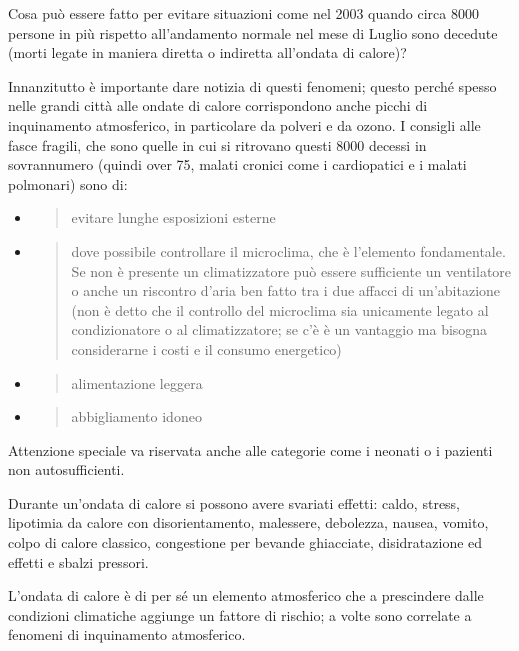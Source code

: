 \documentclass[]{article}
\begin{document}
Cosa può essere fatto per evitare situazioni come nel 2003 quando circa
8000 persone in più rispetto all'andamento normale nel mese di Luglio
sono decedute (morti legate in maniera diretta o indiretta all'ondata di
calore)?

Innanzitutto è importante dare notizia di questi fenomeni; questo perché
spesso nelle grandi città alle ondate di calore corrispondono anche
picchi di inquinamento atmosferico, in particolare da polveri e da
ozono. I consigli alle fasce fragili, che sono quelle in cui si
ritrovano questi 8000 decessi in sovrannumero (quindi over 75, malati
cronici come i cardiopatici e i malati polmonari) sono di:

\begin{itemize}
\item
  \begin{quote}
  evitare lunghe esposizioni esterne
  \end{quote}
\item
  \begin{quote}
  dove possibile controllare il microclima, che è l'elemento
  fondamentale. Se non è presente un climatizzatore può essere
  sufficiente un ventilatore o anche un riscontro d'aria ben fatto tra i
  due affacci di un'abitazione (non è detto che il controllo del
  microclima sia unicamente legato al condizionatore o al
  climatizzatore; se c'è è un vantaggio ma bisogna considerarne i costi
  e il consumo energetico)
  \end{quote}
\item
  \begin{quote}
  alimentazione leggera
  \end{quote}
\item
  \begin{quote}
  abbigliamento idoneo
  \end{quote}
\end{itemize}

Attenzione speciale va riservata anche alle categorie come i neonati o i
pazienti non autosufficienti.

Durante un'ondata di calore si possono avere svariati effetti: caldo,
stress, lipotimia da calore con disorientamento, malessere, debolezza,
nausea, vomito, colpo di calore classico, congestione per bevande
ghiacciate, disidratazione ed effetti e sbalzi pressori.

L'ondata di calore è di per sé un elemento atmosferico che a prescindere
dalle condizioni climatiche aggiunge un fattore di rischio; a volte sono
correlate a fenomeni di inquinamento atmosferico.
\end{document}
